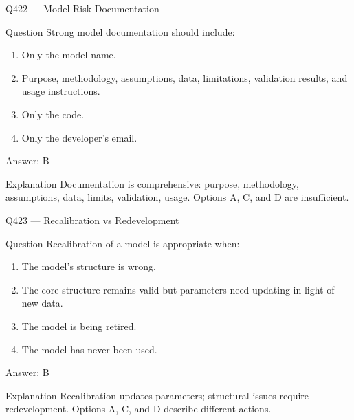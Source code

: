 \documentclass[aspectratio=169,8pt]{beamer}
\begin{document}
	\begin{frame}{Q422 --- Model Risk Documentation}
		\begin{block}{Question}
			Strong model documentation should include:
			\begin{enumerate}
				\item Only the model name.
				\item Purpose, methodology, assumptions, data, limitations, validation results, and usage instructions.
				\item Only the code.
				\item Only the developer's email.
			\end{enumerate}
		\end{block}
		\begin{exampleblock}{Answer: B}\end{exampleblock}
		\begin{block}{Explanation}
			Documentation is comprehensive: purpose, methodology, assumptions, data, limits, validation, usage. Options A, C, and D are insufficient.
		\end{block}
	\end{frame}
	
	\begin{frame}{Q423 --- Recalibration vs Redevelopment}
		\begin{block}{Question}
			Recalibration of a model is appropriate when:
			\begin{enumerate}
				\item The model's structure is wrong.
				\item The core structure remains valid but parameters need updating in light of new data.
				\item The model is being retired.
				\item The model has never been used.
			\end{enumerate}
		\end{block}
		\begin{exampleblock}{Answer: B}\end{exampleblock}
		\begin{block}{Explanation}
			Recalibration updates parameters; structural issues require redevelopment. Options A, C, and D describe different actions.
		\end{block}
	\end{frame}
	
\end{document}
